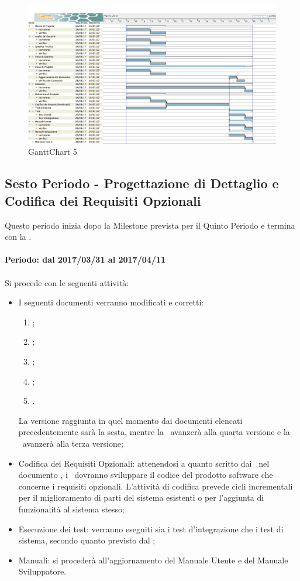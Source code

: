 \documentclass[../PianoDiProgetto.tex]{subfiles}
\begin{document}
	\newpage
	\begin{figure}[!h]
		\centering
		\includegraphics[width=\textwidth]{Pianificazione/Immagini/GanttChart05.png}
		\caption{GanttChart 5}
	\end{figure}	
	
	\subsection{Sesto Periodo - Progettazione di Dettaglio e Codifica dei Requisiti Opzionali}
	Questo periodo inizia dopo la Milestone prevista per il Quinto Periodo e termina con la \revisionediqualifica.
	\\
	\\
	\textbf{Periodo: dal 2017/03/31 al 2017/04/11}
	\\
	\\
	Si procede con le seguenti attività:
	\begin{itemize}
		\item I seguenti documenti verranno modificati e corretti:
			\begin{enumerate}
				\item \normediprogetto;
				\item \analisideirequisiti;
				\item \pianodiqualifica;
				\item \pianodiprogetto;
				\item \glossario.
			\end{enumerate}
		La versione raggiunta in quel momento dai documenti elencati precedentemente sarà la sesta, mentre la \specificatecnica\ avanzerà alla quarta versione e la \ avanzerà alla terza versione;
		\item Codifica dei Requisiti Opzionali: attenendosi a quanto scritto dai \progettisti\ nel documento , i \programmatori\ dovranno sviluppare il codice del prodotto software che concerne i requisiti opzionali. L'attività di codifica prevede cicli incrementali per il miglioramento di parti del sistema esistenti o per l'aggiunta di funzionalità al sistema stesso;
		\item Esecuzione dei test: verranno eseguiti sia i test d'integrazione che i test di sistema, secondo quanto previsto dal \pianodiqualifica;
		\item Manuali: si procederà all'aggiornamento del Manuale Utente e del Manuale Sviluppatore.
	\end{itemize}
	
\end{document}
